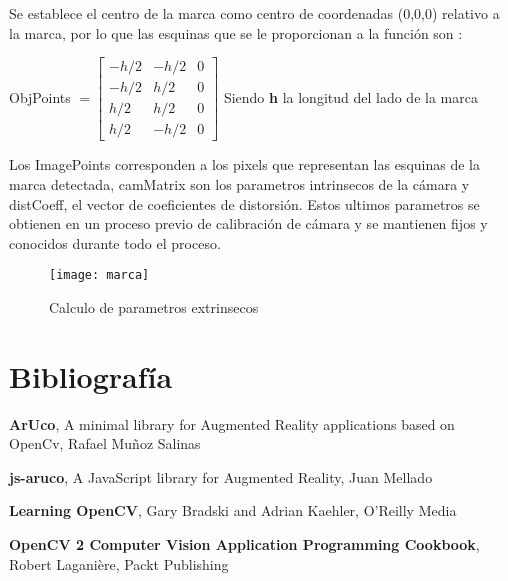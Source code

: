 \documentclass[10pt,a4paper]{article}
\begin{document}
Se establece el centro de la marca como centro de coordenadas (0,0,0) relativo a la marca, por lo que las esquinas que se le proporcionan a la función son :
\begin{center}
ObjPoints $=\begin{bmatrix} -h/2 & -h/2 & 0 \\
                 -h/2 &  h/2 & 0 \\
                  h/2 &  h/2 & 0 \\
                  h/2 & -h/2 & 0   
\end{bmatrix}$
Siendo \textbf{h} la longitud del lado de la marca
\end{center}
Los ImagePoints corresponden a los pixels que representan las esquinas de la marca detectada, camMatrix son los parametros intrinsecos de la cámara y distCoeff, el vector de coeficientes de distorsión. Estos ultimos parametros se obtienen  en un proceso previo de calibración de cámara y se mantienen fijos y conocidos durante todo el proceso.


\begin{figure}
  \centering
    \texttt{[image: marca]}
  \caption{Calculo de parametros extrinsecos}
  \label{Figura 1}
\end{figure}

\section{Bibliografía}

\textbf{ArUco}, A minimal library for Augmented Reality applications based on OpenCv, Rafael Muñoz Salinas

\textbf{js-aruco},  A JavaScript library for Augmented Reality,  Juan Mellado

\textbf{Learning OpenCV}, Gary Bradski and Adrian Kaehler, O’Reilly Media

\textbf{OpenCV 2 Computer Vision Application Programming Cookbook}, Robert Laganière, Packt Publishing
\end{document}
